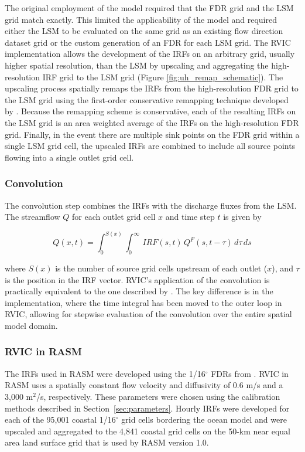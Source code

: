 \documentclass[jgrga, draft]{agutex}
\begin{document}
\begin{article}
The original employment of the \citet{Lohmann_1996} model required that the FDR grid and the LSM grid match exactly.
This limited the applicability of the model and required either the LSM to be evaluated on the same grid as an existing flow direction dataset grid or the custom generation of an FDR for each LSM grid.
The RVIC implementation allows the development of the IRFs on an arbitrary grid, usually higher spatial resolution, than the LSM by upscaling and aggregating the high-resolution IRF grid to the LSM grid (Figure \ref{fig:uh_remap_schematic}).
The upscaling process spatially remaps the IRFs from the high-resolution FDR grid to the LSM grid using the first-order conservative remapping technique developed by \citet{Jones_1999}.
Because the remapping scheme is conservative, each of the resulting IRFs on the LSM grid is an area weighted average of the IRFs on the high-resolution FDR grid.
Finally, in the event there are multiple sink points on the FDR grid within a single LSM grid cell, the upscaled IRFs are combined to include all source points flowing into a single outlet grid cell.

\subsubsection{Convolution}
\label{sec:convolution}

The convolution step combines the IRFs with the discharge fluxes from the LSM.
The streamflow $Q$ for each outlet grid cell $x$ and time step $t$ is given by

\begin{equation}
  \label{eq:convolution}
   Q(x,t) = \int_0^{S(x)} \int_0^{\infty}\,IRF(s,t)\,Q^F(s,t-\tau)\,d\tau\,ds
 \end{equation}

where $S(x)$ is the number of source grid cells upstream of each outlet ($x$), and $\tau$ is the position in the IRF vector.
RVIC's application of the convolution is practically equivalent to the one described by \citet{Lohmann_1996}.
The key difference is in the implementation, where the time integral has been moved to the outer loop in RVIC, allowing for stepwise evaluation of the convolution over the entire spatial model domain.

\subsubsection{RVIC in RASM}

The IRFs used in RASM were developed using the 1/16$^{\circ}$ FDRs from \citet{Wu_2011}.
RVIC in RASM uses a spatially constant flow velocity and diffusivity of 0.6 m/s and a 3,000 m$^2$/s, respectively.
These parameters were chosen using the calibration methods described in Section~\ref{sec:parameters}.
Hourly IRFs were developed for each of the 95,001 coastal 1/16$^{\circ}$ grid cells bordering the ocean model and were upscaled and aggregated to the 4,841 coastal grid cells on the 50-km near equal area land surface grid that is used by RASM version 1.0.


\end{article}
\end{document}

